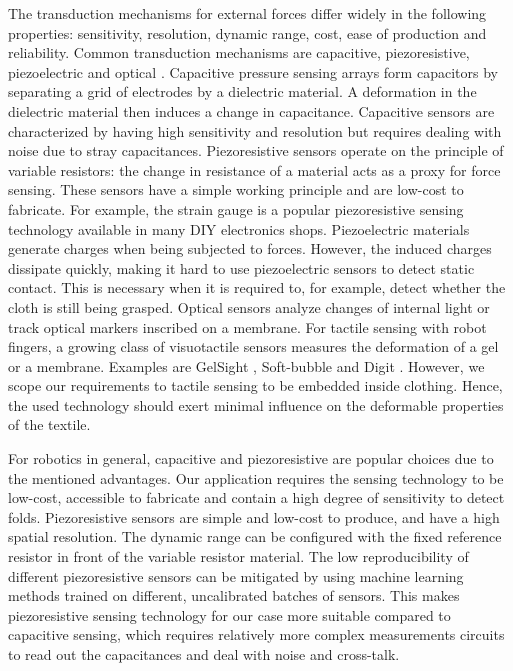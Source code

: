 \documentclass[\home/main.tex]{subfiles}
\begin{document}
The transduction mechanisms for external forces differ widely in the following properties: sensitivity, resolution, dynamic range, cost, ease of production and reliability. Common transduction mechanisms are capacitive, piezoresistive, piezoelectric and optical \autocite{Chi2018}.
Capacitive pressure sensing arrays form capacitors by separating a grid of electrodes by a dielectric material. A deformation in the dielectric material then induces a change in capacitance. Capacitive sensors are characterized by having high sensitivity and resolution but requires dealing with noise due to stray capacitances.
Piezoresistive sensors operate on the principle of variable resistors: the change in resistance of a material acts as a proxy for force sensing. These sensors have a simple working principle and are low-cost to fabricate. For example, the strain gauge is a popular piezoresistive sensing technology available in many DIY electronics shops.
Piezoelectric materials generate charges when being subjected to forces. However, the induced charges dissipate quickly, making it hard to use piezoelectric sensors to detect static contact. This is necessary when it is required to, for example, detect whether the cloth is still being grasped.
Optical sensors analyze changes of internal light or track optical markers inscribed on a membrane. For tactile sensing with robot fingers, a growing class of visuotactile sensors measures the deformation of a gel or a membrane. Examples are GelSight \autocite{Yuan2017}, Soft-bubble \autocite{Naveen2020fast} and Digit \autocite{digit2020}. However, we scope our requirements to tactile sensing to be embedded inside clothing. Hence, the used technology should exert minimal influence on the deformable properties of the textile.

For robotics in general, capacitive and piezoresistive are popular choices due to the mentioned advantages. Our application requires the sensing technology to be low-cost, accessible to fabricate and contain a high degree of sensitivity to detect folds. Piezoresistive sensors are simple and low-cost to produce, and have a high spatial resolution. The dynamic range can be configured with the fixed reference resistor in front of the variable resistor material. The low reproducibility of different piezoresistive sensors can be mitigated by using machine learning methods trained on different, uncalibrated batches of sensors. This makes piezoresistive sensing technology for our case more suitable compared to capacitive sensing, which requires relatively more complex measurements circuits to read out the capacitances and deal with noise and cross-talk.
\end{document}
